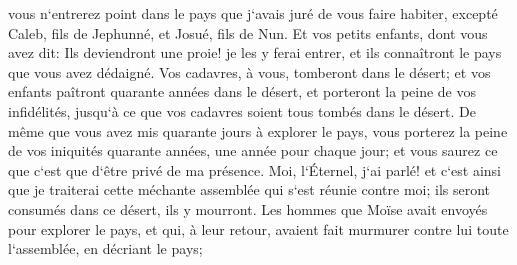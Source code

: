 \verse vous n`entrerez point dans le pays que j`avais juré de vous faire habiter, excepté Caleb, fils de Jephunné, et Josué, fils de Nun. 
\verse Et vos petits enfants, dont vous avez dit: Ils deviendront une proie! je les y ferai entrer, et ils connaîtront le pays que vous avez dédaigné. 
\verse Vos cadavres, à vous, tomberont dans le désert; 
\verse et vos enfants paîtront quarante années dans le désert, et porteront la peine de vos infidélités, jusqu`à ce que vos cadavres soient tous tombés dans le désert. 
\verse De même que vous avez mis quarante jours à explorer le pays, vous porterez la peine de vos iniquités quarante années, une année pour chaque jour; et vous saurez ce que c`est que d`être privé de ma présence. 
\verse Moi, l`Éternel, j`ai parlé! et c`est ainsi que je traiterai cette méchante assemblée qui s`est réunie contre moi; ils seront consumés dans ce désert, ils y mourront. 
\verse Les hommes que Moïse avait envoyés pour explorer le pays, et qui, à leur retour, avaient fait murmurer contre lui toute l`assemblée, en décriant le pays; 
